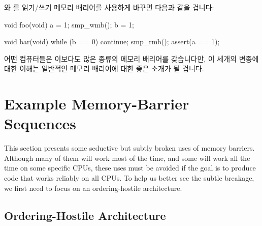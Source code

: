  와  를 읽기/쓰기 메모리 배리어를 사용하게 바꾸면 다음과
같을 겁니다:

\iffalse

The effect of this is that a read memory barrier orders only loads
on the CPU that executes it, so that all loads preceding the read memory
barrier will appear to have completed before any load following the
read memory barrier.
Similarly, a write memory barrier orders
only stores, again on the CPU that executes it, and again so that
all stores preceding the write memory barrier will appear to have
completed before any store following the write memory barrier.
A full-fledged memory barrier orders both loads and stores, but again
only on the CPU executing the memory barrier.

If we update \co{foo()} and \co{bar()} to use read and write memory
barriers, they appear as follows:

\fi

\begin{VerbatimN}[fontsize=\footnotesize,samepage=true]
void foo(void)
{
	a = 1;
	smp_wmb();
	b = 1;
}

void bar(void)
{
	while (b == 0) continue;
	smp_rmb();
	assert(a == 1);
}
\end{VerbatimN}

어떤 컴퓨터들은 이보다도 많은 종류의 메모리 배리어를 갖습니다만, 이 세개의
변종에 대한 이해는 일반적인 메모리 배리어에 대한 좋은 소개가 될 겁니다.

\iffalse

Some computers have even more flavors of memory barriers, but
understanding these three variants will provide a good introduction
to memory barriers in general.

\fi

\section{Example Memory-Barrier Sequences}
\label{sec:app:whymb:Example Memory-Barrier Sequences}

This section presents some seductive but subtly broken uses of
memory barriers.
Although many of them will work most of the time, and some will
work all the time on some specific CPUs, these uses must be avoided
if the goal is to produce code that works reliably on all CPUs.
To help us better see the subtle breakage, we first need to focus
on an ordering-hostile architecture.

\subsection{Ordering-Hostile Architecture}
\label{sec:app:whymb:Ordering-Hostile Architecture}

